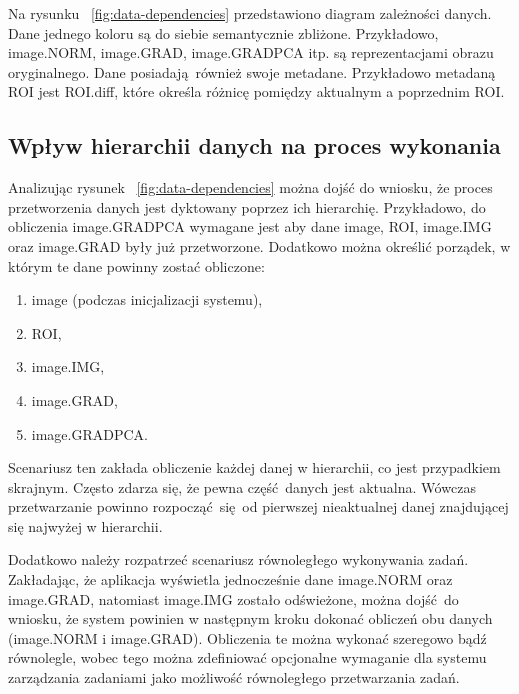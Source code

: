 
Na rysunku ~\ref{fig:data-dependencies} przedstawiono diagram zależności danych. Dane jednego koloru są do siebie semantycznie zbliżone. Przykładowo, image.NORM, image.GRAD, image.GRADPCA itp. są reprezentacjami obrazu oryginalnego. Dane posiadają również swoje metadane. Przykładowo metadaną ROI jest ROI.diff, które określa różnicę pomiędzy aktualnym a poprzednim ROI. 

\subsection{Wpływ hierarchii danych na proces wykonania}
Analizując rysunek ~\ref{fig:data-dependencies} można dojść do wniosku, że proces przetworzenia danych jest dyktowany poprzez ich hierarchię. Przykładowo, do obliczenia image.GRADPCA wymagane jest aby dane image, ROI, image.IMG oraz image.GRAD były już przetworzone. Dodatkowo można określić porządek, w którym te dane powinny zostać obliczone:

\begin{enumerate}[labelwidth=\widthof{\ref{last-item}},label=\arabic*.]
	\item image (podczas inicjalizacji systemu),
	\item ROI,
	\item image.IMG,
	\item image.GRAD,
	\item image.GRADPCA. \label{last-item}
\end{enumerate}

Scenariusz ten zakłada obliczenie każdej danej w hierarchii, co jest przypadkiem skrajnym. Często zdarza się, że pewna część danych jest aktualna. Wówczas przetwarzanie powinno rozpocząć się od pierwszej nieaktualnej danej znajdującej się najwyżej w hierarchii. 

Dodatkowo należy rozpatrzeć scenariusz równoległego wykonywania zadań. Zakładając, że aplikacja wyświetla jednocześnie dane image.NORM oraz image.GRAD, natomiast image.IMG zostało odświeżone, można dojść do wniosku, że system powinien w następnym kroku dokonać obliczeń obu danych (image.NORM i image.GRAD). Obliczenia te można wykonać szeregowo bądź równolegle, wobec tego można zdefiniować opcjonalne wymaganie dla systemu zarządzania zadaniami jako możliwość równoległego przetwarzania zadań.
